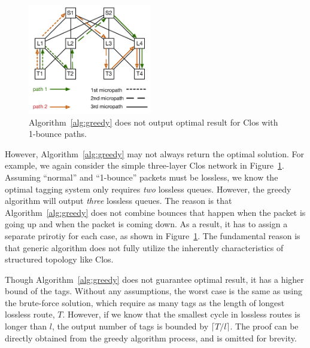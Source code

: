 \begin{figure}[t]
	\centering
	\includegraphics[width=0.48\textwidth] {figs/nonoptimal_example}
	\caption{Algorithm~\ref{alg:greedy} does not output optimal result for Clos with 1-bounce paths.}
	\label{fig:nonoptimal}
\end{figure}

However, Algorithm~\ref{alg:greedy} may not always return the optimal solution. For example, 
we again consider the simple three-layer Clos network in Figure~\ref{fig:nonoptimal}. 
Assuming ``normal'' and ``1-bounce'' packets must be lossless,  
we know the optimal tagging system only requires {\em two} lossless queues. However, the 
greedy algorithm will output {\em three} lossless queues. The reason is that 
Algorithm~\ref{alg:greedy} does not combine bounces that happen when the packet is going up
and when the packet is coming down. As a result, it has to 
assign a separate prirotiy for each case, as shown in Figure~\ref{fig:nonoptimal}.
The fundamental reason is that generic algorithm does not fully utilize the inherently 
characteristics of structured topology like Clos. 


 Though Algorithm~\ref{alg:greedy} does not guarantee optimal result, 
it has a higher bound of the tags. Without any assumptions, the worst case 
is the same as using the brute-force solution, which require as many tags as the length of 
longest lossless route, $T$. However, if we know that the smallest cycle in lossless routes
is longer than $l$, the output number of tags is bounded by $\lceil T/l \rceil$. The proof
can be directly obtained from the greedy algorithm process, and is omitted for brevity.

